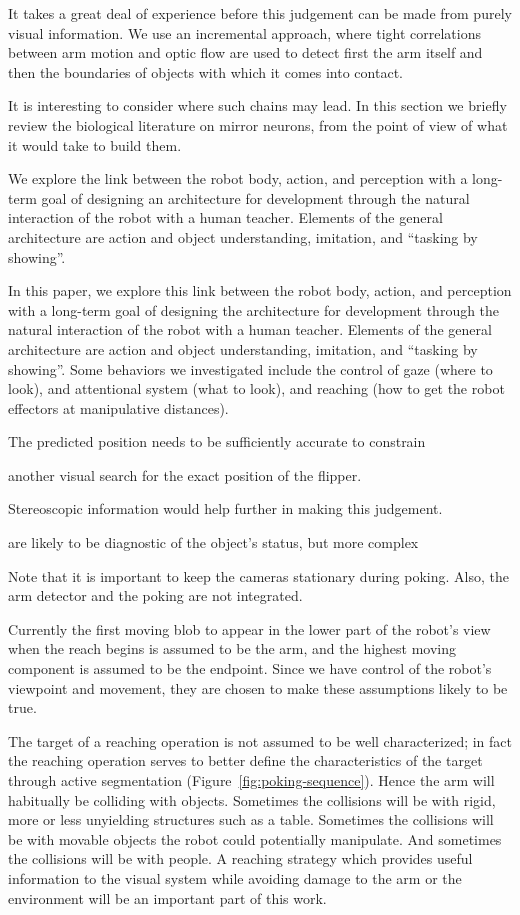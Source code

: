 It takes a great
deal of experience before this judgement can be made from purely
visual information.  We use an incremental approach, where tight
correlations between arm motion and optic flow are used to detect
first the arm itself and then the boundaries of objects with which it
comes into contact.  

It is interesting to consider where such
chains may lead.  In this section we briefly review the biological
literature on mirror neurons, from the point of view of what it 
would take to build them.

We explore the link between the robot body, action,
and perception with a long-term goal of designing an architecture for
development through the natural interaction of the robot with a human
teacher. Elements of the general architecture are action and object
understanding, imitation, and ``tasking by showing''. 


In this paper, we explore this link between the robot body, action,
and perception with a long-term goal of designing the architecture for
development through the natural interaction of the robot with a human
teacher. Elements of the general architecture are action and object
understanding, imitation, and ``tasking by showing''. Some behaviors
we investigated include the control of gaze (where to look), and
attentional system (what to look), and reaching (how to get the robot
effectors at manipulative distances).

The predicted position needs to be sufficiently accurate to constrain

another visual search for the exact position of the flipper.

Stereoscopic information would help further in making this
judgement.  

are likely to be diagnostic of the object's status, but more complex

Note that it is important to keep the cameras
stationary during poking.  Also, the arm detector and the poking are
not integrated.

Currently the first moving blob
to appear in the lower part of the robot's view when the reach begins
is assumed to be the arm, and the highest moving component is assumed
to be the endpoint.  Since we have control of the robot's viewpoint
and movement, they are chosen to make these assumptions likely to be
true.  



The target of a reaching operation is not assumed to be well
characterized; in fact the reaching operation serves to better define
the characteristics of the target through active segmentation
(Figure~\ref{fig:poking-sequence}).  
Hence the arm will habitually be
colliding with objects.  Sometimes the collisions will be with rigid,
more or less unyielding structures such as a table.  Sometimes the
collisions will be with movable objects the robot could potentially
manipulate.  And sometimes the collisions will be with people.  A
reaching strategy which provides useful information to the visual
system while avoiding damage to the arm or the environment will be an
important part of this work.

